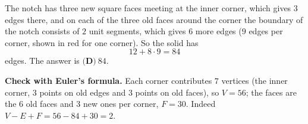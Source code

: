 The notch has three new square faces meeting at the inner corner, which gives $3$ edges there, and on each of the three old faces around the corner the boundary of the notch consists of $2$ unit segments, which gives $6$ more edges ($9$ edges per corner, shown in red for one corner). So the solid has
\[12+8\cdot9=84\]
edges. The answer is $\boxed{\textbf{(D)}\ 84}$.

\textbf{Check with Euler's formula.} Each corner contributes $7$ vertices (the inner corner, $3$ points on old edges and $3$ points on old faces), so $V=56$; the faces are the $6$ old faces and $3$ new ones per corner, $F=30$. Indeed $V-E+F=56-84+30=2$.
